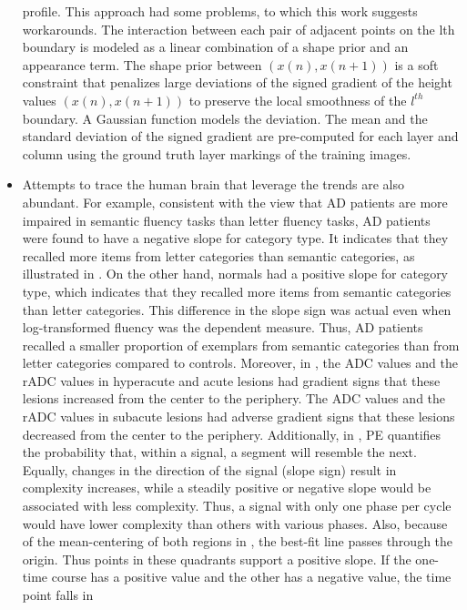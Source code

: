 \documentclass[11pt]{book}
\begin{document}
\begin{itemize}
profile. This approach had some problems, to which this work suggests
workarounds. The interaction between each pair of adjacent points
on the lth boundary is modeled as a linear combination of a shape
prior and an appearance term. The shape prior between $\left(x\left(n\right),x\left(n+1\right)\right)$
is a soft constraint that penalizes large deviations of the signed
gradient of the height values $\left(x\left(n\right),x\left(n+1\right)\right)$
to preserve the local smoothness of the $l^{th}$ boundary. A Gaussian
function models the deviation. The mean and the standard deviation
of the signed gradient are pre-computed for each layer and column
using the ground truth layer markings of the training images.
\item Attempts to trace the human brain that leverage the trends are also
abundant. For example, consistent with the view that AD patients are
more impaired in semantic fluency tasks than letter fluency tasks,
AD patients were found to have a negative slope for category type.
It indicates that they recalled more items from letter categories
than semantic categories, as illustrated in \cite{diaz2004category}.
On the other hand, normals had a positive slope for category type,
which indicates that they recalled more items from semantic categories
than letter categories. This difference in the slope sign was actual
even when log-transformed fluency was the dependent measure. Thus,
AD patients recalled a smaller proportion of exemplars from semantic
categories than from letter categories compared to controls. Moreover,
in \cite{shen2011use},
the ADC values and the rADC values in hyperacute and acute lesions
had gradient signs that these lesions increased from the center to
the periphery. The ADC values and the rADC values in subacute lesions
had adverse gradient signs that these lesions decreased from the center
to the periphery. Additionally, in \cite{godino2017towards},
PE quantifies the probability that, within a signal, a segment will
resemble the next. Equally, changes in the direction of the signal
(slope sign) result in complexity increases, while a steadily positive
or negative slope would be associated with less complexity. Thus,
a signal with only one phase per cycle would have lower complexity
than others with various phases. Also, because of the mean-centering
of both regions in \cite{tompary2018attending},
the best-fit line passes through the origin. Thus points in these
quadrants support a positive slope. If the one-time course has a positive
value and the other has a negative value, the time point falls in

\end{itemize}
\end{document}
